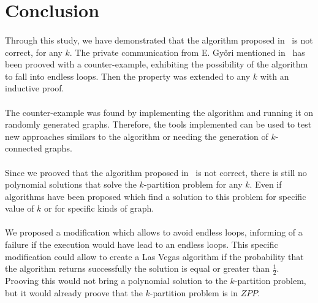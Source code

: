\section{Conclusion}

\paragraph{}
Through this study, we have demonstrated that the algorithm proposed
in~\cite{JS94} is not correct, for any $k$. The private communication from E.
Gy{\H o}ri mentioned in~\cite{Nakano1997315} has been prooved with a
counter-example, exhibiting the possibility of the algorithm to fall into
endless loops. Then the property was extended to any $k$ with an inductive
proof.

\paragraph{}
The counter-example was found by implementing the algorithm and running it on
randomly generated graphs. Therefore, the tools implemented can be used to
test new approaches similars to the algorithm or needing the generation of
$k$-connected graphs.

\paragraph{}
Since we prooved that the algorithm proposed in~\cite{JS94} is not correct,
there is still no polynomial solutions that solve the $k$-partition problem
for any $k$. Even if algorithms have been proposed which find a solution to
this problem for specific value of $k$ or for specific kinds of graph.

\paragraph{}
We proposed a modification which allows to avoid endless loops, informing of
a failure if the execution would have lead to an endless loops. This specific
modification could allow to create a Las Vegas algorithm if the probability
that the algorithm returns successfully the solution is equal or greater than 
$\frac{1}{2}$. Prooving this would not bring a polynomial solution to the
$k$-partition problem, but it would already proove that the $k$-partition
problem is in $ZPP$.